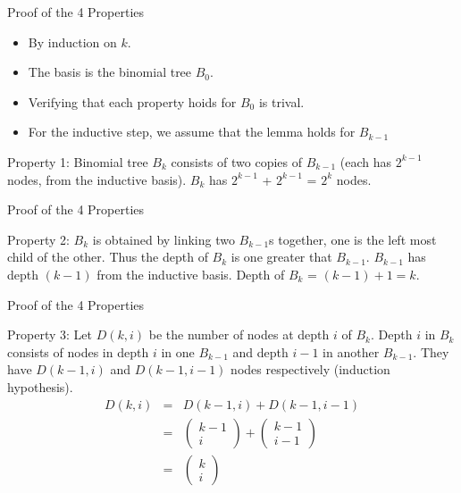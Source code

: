 \documentclass{beamer}
\begin{document}
\begin{frame}{}
\centerline{\large Proof of the 4 Properties}
\vspace{0.5cm}
\begin{itemize}
\item By induction on $k$. 
\item The basis is the binomial tree $B_0$. 
\item Verifying that each property hoids for $B_0$ is trival. 
\item For the inductive step, we assume that the lemma holds for $B_{k-1}$
\end{itemize}
Property 1: Binomial tree $B_k$ consists of two copies of $B_{k-1}$ (each has $2^{k-1}$ nodes, from the inductive basis).
$B_k$ has $2^{k-1}$ + $2^{k-1}$ = $2^k$ nodes. 
\end{frame}

\begin{frame}{}
\centerline{\large Proof of the 4 Properties}
\vspace{0.5cm}
Property 2: $B_k$ is obtained by linking two $B_{k-1}$s together, one is the left most child of the other. 
Thus the depth of $B_k$ is one greater that $B_{k-1}$. $B_{k-1}$ has depth $(k-1)$ from the inductive basis.
Depth of $B_k$ = $(k-1) +1 =k$.
\end{frame}

\begin{frame}{}
\centerline{\large Proof of the 4 Properties}
Property 3: Let $D(k,i)$ be the number of nodes at depth $i$ of $B_k$. Depth $i$ in $B_k$
 consists of nodes in depth $i$ in one $B_{k-1}$ and depth $i-1$ in another $B_{k-1}$. They have
 $D(k-1,i)$ and $D(k-1,i-1)$ nodes respectively (induction hypothesis). 
\begin{eqnarray}
D(k,i) &=& D(k-1,i) + D(k-1,i-1) \nonumber\\
 &=& \left (  \begin{array}{c} k-1 \\ i  \end{array}\right ) + \left (  \begin{array}{c} k-1 \\ i-1  \end{array}\right ) \nonumber\\
 &=& \left (  \begin{array}{c} k \\ i  \end{array}\right ) \nonumber
\end{eqnarray}
\end{frame}
\end{document}
